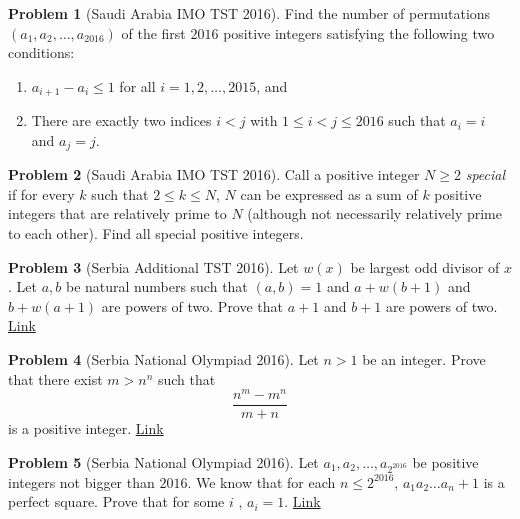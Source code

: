 \documentclass[]{article}
\theoremstyle{definition}
\newtheorem{problem}{Problem}
\begin{document}
\begin{problem}[Saudi Arabia IMO TST 2016]
	Find the number of permutations $(a_1, a_2, \dots, a_{2016})$ of the first $2016$ positive integers satisfying the following two conditions:
		\begin{enumerate}
			\item $a_{i+1} - a_i \leq 1$ for all $i =1 , 2, \dots, 2015$, and
			\item There are exactly two indices $i < j$ with $1 \leq i < j \leq 2016$ such that $a_i = i$ and $a_j = j$.
		\end{enumerate}
\end{problem}



\begin{problem}[Saudi Arabia IMO TST 2016]
	Call a positive integer $N \geq 2$ \textit{special} if for every $k$ such that $2 \leq k \leq N$, $N$ can be expressed as a sum of $k$ positive integers that are relatively prime to $N$ (although not necessarily relatively prime to each other). Find all special positive integers.
\end{problem}



\begin{problem}[Serbia Additional TST 2016]
	Let $w(x)$ be largest odd divisor of $x$. Let $a,b$ be natural numbers such that $(a,b)=1$ and $a+w(b+1)$ and $b+w(a+1)$ are powers of two. Prove that $a+1$ and $b+1$ are powers of two. \hfill \href{http://artofproblemsolving.com/community/c6h1222842p6126065}{Link}
\end{problem}



\begin{problem}[Serbia National Olympiad 2016]
	Let $n>1$ be an integer. Prove that there exist $m>n^n $ such that $$\frac {n^m-m^n}{m+n}$$ is a positive integer. \hfill \href{http://artofproblemsolving.com/community/c6h1220643p6101949}{Link}
\end{problem}




\begin{problem}[Serbia National Olympiad 2016]
	Let $a_1, a_2, \dots, a_{2^{2016}}$ be positive integers not bigger than $2016$. We know that for each $n \leq 2^{2016}$, $a_1a_2 \dots a_{n} +1 $ is a perfect square. Prove that for some $i $ , $a_i=1$. \hfill \href{http://artofproblemsolving.com/community/c6h1221134p6106775}{Link}
\end{problem}
\end{document}
